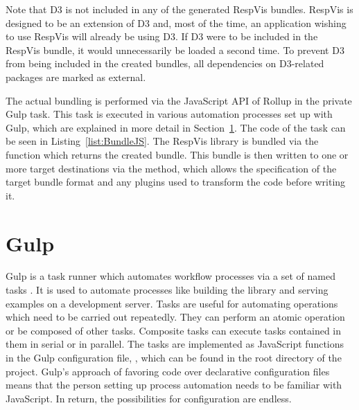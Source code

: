 Note that D3 is not included in any of the generated RespVis
bundles. RespVis is designed to be an extension of D3 and, most of the
time, an application wishing to use RespVis will already be using
D3. If D3 were to be included in the RespVis bundle, it would
unnecessarily be loaded a second time. To prevent D3 from being
included in the created bundles, all dependencies on D3-related
packages are marked as external.

The actual bundling is performed via the JavaScript API of Rollup in
the private  Gulp task. This task is executed in
various automation processes set up with Gulp, which are explained in
more detail in Section~\ref{sec:Gulp}. The code of the 
task can be seen in Listing~\ref{list:BundleJS}. The RespVis library
is bundled via the  function which returns the
created bundle. This bundle is then written to one or more target
destinations via the  method, which allows the
specification of the target bundle format and any plugins used to
transform the code before writing it.


\begin{samepage}
%
The private Gulp task which bundles the code of the RespVis libary.
The bundle is created once and then written to multiple targets.
}
]{listings/bundle-js.js}
\end{samepage}
  





\section{Gulp}
\label{sec:Gulp}

Gulp is a task runner which automates workflow processes via a set of
named tasks \parencite{Gulp}. It is used to automate processes like
building the library and serving examples on a development server.
Tasks are useful for automating operations which need to be carried
out repeatedly. They can perform an atomic operation or be composed of
other tasks. Composite tasks can execute tasks contained in them in
serial or in parallel. The tasks are implemented as JavaScript
functions in the Gulp configuration file, , which
can be found in the root directory of the project. Gulp's approach of
favoring code over declarative configuration files means that the
person setting up process automation needs to be familiar with
JavaScript. In return, the possibilities for configuration are
endless.

